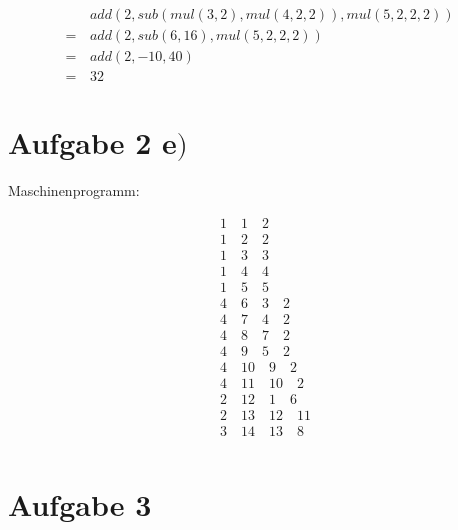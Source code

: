 \documentclass{article}
\begin{document}
	\begin{align}
			& \, add(2, sub(mul(3,2), mul(4, 2, 2)), mul(5, 2, 2, 2)) \\
			= & \, add(2, sub(6, 16), mul(5, 2, 2, 2)) \\
			= & \, add(2, -10, 40) \\
			= & \, 32
	\end{align}
	
	\section*{Aufgabe 2 e$)$}
	
	Maschinenprogramm:
	
	\begin{align}
	& 1 \quad 1 \quad 2 \\
	& 1 \quad 2 \quad 2 \\
	& 1 \quad 3 \quad 3 \\
	& 1 \quad 4 \quad 4 \\
	& 1 \quad 5 \quad 5 \\
	& 4 \quad 6 \quad 3 \quad 2 \\
	& 4 \quad 7 \quad 4 \quad 2 \\
	& 4 \quad 8 \quad 7 \quad 2 \\
	& 4 \quad 9 \quad 5 \quad 2 \\
	& 4 \quad 10 \quad 9 \quad 2 \\
	& 4 \quad 11 \quad 10 \quad 2 \\
	& 2 \quad 12 \quad 1 \quad 6  \\
	& 2 \quad 13 \quad 12 \quad 11 \\
	& 3 \quad 14 \quad 13 \quad 8 \\
	\end{align}
	
	\section*{Aufgabe 3}

			
	
\end{document}
